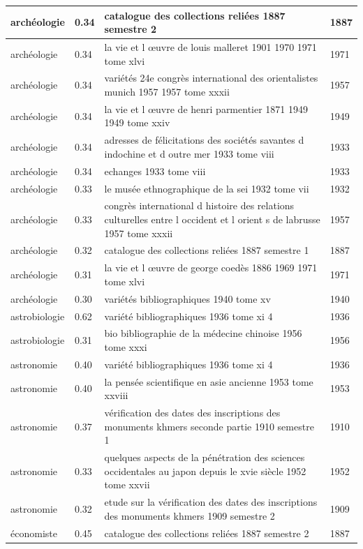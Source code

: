 \begin{longtable}{|p{3cm}|p{1cm}|p{10cm}|p{1cm}|}
archéologie & 0.34 & catalogue des collections reliées 1887 semestre 2 & 1887  \\ \hline
archéologie & 0.34 & la vie et l œuvre de louis malleret 1901 1970 1971 tome xlvi & 1971  \\ \hline
archéologie & 0.34 & variétés 24e congrès international des orientalistes munich 1957 1957 tome xxxii & 1957  \\ \hline
archéologie & 0.34 & la vie et l œuvre de henri parmentier 1871 1949 1949 tome xxiv & 1949  \\ \hline
archéologie & 0.34 & adresses de félicitations des sociétés savantes d indochine et d outre mer 1933 tome viii & 1933  \\ \hline
archéologie & 0.34 & echanges 1933 tome viii & 1933  \\ \hline
archéologie & 0.33 & le musée ethnographique de la sei 1932 tome vii & 1932  \\ \hline
archéologie & 0.33 & congrès international d histoire des relations culturelles entre l occident et l orient s de labrusse 1957 tome xxxii & 1957  \\ \hline
archéologie & 0.32 & catalogue des collections reliées 1887 semestre 1 & 1887  \\ \hline
archéologie & 0.31 & la vie et l œuvre de george coedès 1886 1969 1971 tome xlvi & 1971  \\ \hline
archéologie & 0.30 & variétés bibliographiques 1940 tome xv & 1940  \\ \hline
astrobiologie & 0.62 & variété bibliographiques 1936 tome xi 4 & 1936  \\ \hline
astrobiologie & 0.31 & bio bibliographie de la médecine chinoise 1956 tome xxxi & 1956  \\ \hline
astronomie & 0.40 & variété bibliographiques 1936 tome xi 4 & 1936  \\ \hline
astronomie & 0.40 & la pensée scientifique en asie ancienne 1953 tome xxviii & 1953  \\ \hline
astronomie & 0.37 & vérification des dates des inscriptions des monuments khmers seconde partie 1910 semestre 1 & 1910  \\ \hline
astronomie & 0.33 & quelques aspects de la pénétration des sciences occidentales au japon depuis le xvie siècle 1952 tome xxvii & 1952  \\ \hline
astronomie & 0.32 & etude sur la vérification des dates des inscriptions des monuments khmers 1909 semestre 2 & 1909  \\ \hline
économiste & 0.45 & catalogue des collections reliées 1887 semestre 2 & 1887  \\ \hline

\end{longtable}
